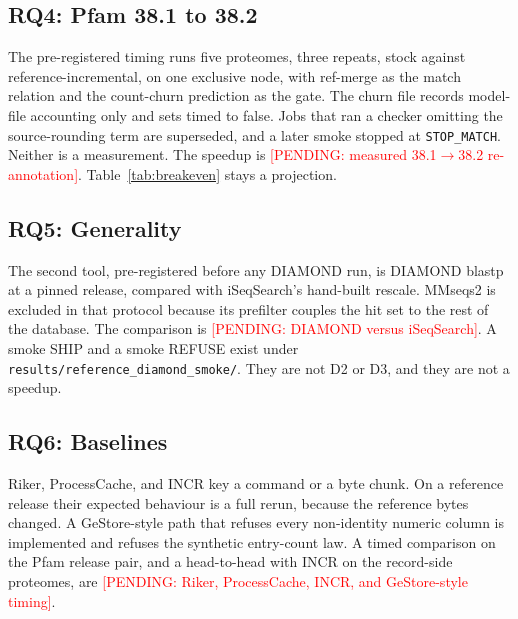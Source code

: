 \documentclass[letterpaper,twocolumn,10pt]{article}
\newcommand{\pending}[1]{\textcolor{red}{[PENDING: #1]}}
\begin{document}
\subsection{RQ4: Pfam 38.1 to 38.2}
\label{sec:rq4}

The pre-registered timing runs five proteomes, three repeats, stock against reference-incremental, on one exclusive node, with ref-merge as the match relation and the count-churn prediction as the gate.
The churn file records model-file accounting only and sets timed to false.
Jobs that ran a checker omitting the source-rounding term are superseded, and a later smoke stopped at \texttt{STOP\_MATCH}.
Neither is a measurement.
The speedup is
\pending{measured 38.1$\to$38.2 re-annotation}.
Table~\ref{tab:breakeven} stays a projection.

\subsection{RQ5: Generality}
\label{sec:rq5}

The second tool, pre-registered before any DIAMOND run, is DIAMOND blastp at a pinned release, compared with iSeqSearch's hand-built rescale.
MMseqs2 is excluded in that protocol because its prefilter couples the hit set to the rest of the database.
The comparison is
\pending{DIAMOND versus iSeqSearch}.
A smoke SHIP
and a smoke REFUSE
exist under \texttt{results/reference\_diamond\_smoke/}.
They are not D2 or D3, and they are not a speedup.

\subsection{RQ6: Baselines}
\label{sec:rq6}

Riker, ProcessCache, and INCR key a command or a byte chunk.
On a reference release their expected behaviour is a full rerun, because the reference bytes changed.
A GeStore-style path that refuses every non-identity numeric column is implemented and refuses the synthetic entry-count law.
A timed comparison on the Pfam release pair, and a head-to-head with INCR on the record-side proteomes, are
\pending{Riker, ProcessCache, INCR, and GeStore-style timing}.
\end{document}
